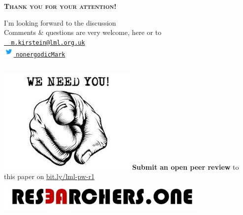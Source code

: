 \begin{frame}

\centering
\vspace{2em}

{\Large \textsc{\textbf{Thank you for your attention!}}}\\

\vspace{2em}

I'm looking forward to the discussion\\
Comments \& questions are very welcome, here or to\\
\vspace{.5em}
\texttt{\href{mailto: m.kirstein@lml.org.uk}{\Letter ~ m.kirstein@lml.org.uk}}\\

\href{https://twitter.com/nonergodicMark}{\includegraphics[height=1.4em,valign=c]{img/Twitter_Logo_Blue} \MVAt \texttt{nonergodicMark}}

\vspace{2em}

\begin{columns}[T]
	\includegraphics[width=.9\textwidth]{img/weneedu}
	\textbf{Submit an open peer review} to this paper on \url{bit.ly/lml-pw-r1} 
	\includegraphics[width=.9\textwidth]{img/resone-logo} \\
\end{columns}

\end{frame}